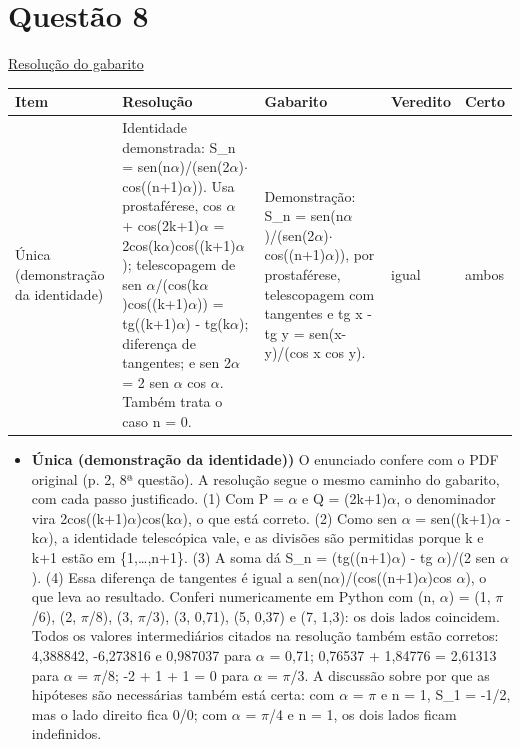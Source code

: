 \documentclass{article}%
\begin{document}
\section*{Questão 8}%
\href{https://poliedroresolve.sistemapoliedro.com.br/vestibulares/ime/2027/ime-2-fase-dia-1-26-10-2026-2-fase-dia-1/dissertativa-8-matematica-2-fase-dia-1-ime-2027}{Resolução do gabarito}\par\smallskip%
\begin{longtable}{@{}p{} p{} p{} p{} p{}@{}}\toprule Item & Resolução & Gabarito & Veredito & Certo \\ \midrule
Única (demonstração da identidade) & Identidade demonstrada: S\_n = sen(n$\alpha$)/(sen(2$\alpha$)$\cdot$cos((n+1)$\alpha$)). Usa prostaférese, cos $\alpha$ + cos(2k+1)$\alpha$ = 2cos(k$\alpha$)cos((k+1)$\alpha$); telescopagem de sen $\alpha$/(cos(k$\alpha$)cos((k+1)$\alpha$)) = tg((k+1)$\alpha$) - tg(k$\alpha$); diferença de tangentes; e sen 2$\alpha$ = 2 sen $\alpha$ cos $\alpha$. Também trata o caso n = 0. & Demonstração: S\_n = sen(n$\alpha$)/(sen(2$\alpha$)$\cdot$cos((n+1)$\alpha$)), por prostaférese, telescopagem com tangentes e tg x - tg y = sen(x-y)/(cos x cos y). & igual & ambos \\
\bottomrule\end{longtable}%
\begin{itemize}%
\item%
\textbf{Única (demonstração da identidade))} O enunciado confere com o PDF original (p. 2, 8ª questão). A resolução segue o mesmo caminho do gabarito, com cada passo justificado. (1) Com P = $\alpha$ e Q = (2k+1)$\alpha$, o denominador vira 2cos((k+1)$\alpha$)cos(k$\alpha$), o que está correto. (2) Como sen $\alpha$ = sen((k+1)$\alpha$ - k$\alpha$), a identidade telescópica vale, e as divisões são permitidas porque k e k+1 estão em \{1,\ldots{},n+1\}. (3) A soma dá S\_n = (tg((n+1)$\alpha$) - tg $\alpha$)/(2 sen $\alpha$). (4) Essa diferença de tangentes é igual a sen(n$\alpha$)/(cos((n+1)$\alpha$)cos $\alpha$), o que leva ao resultado. Conferi numericamente em Python com (n, $\alpha$) = (1, $\pi$/6), (2, $\pi$/8), (3, $\pi$/3), (3, 0,71), (5, 0,37) e (7, 1,3): os dois lados coincidem. Todos os valores intermediários citados na resolução também estão corretos: 4,388842, -6,273816 e 0,987037 para $\alpha$ = 0,71; 0,76537 + 1,84776 = 2,61313 para $\alpha$ = $\pi$/8; -2 + 1 + 1 = 0 para $\alpha$ = $\pi$/3. A discussão sobre por que as hipóteses são necessárias também está certa: com $\alpha$ = $\pi$ e n = 1, S\_1 = -1/2, mas o lado direito fica 0/0; com $\alpha$ = $\pi$/4 e n = 1, os dois lados ficam indefinidos.%
\end{itemize}%
\end{document}
